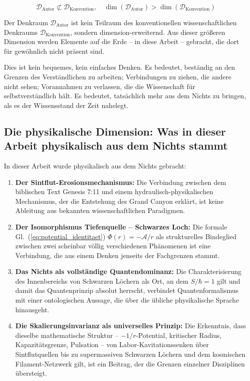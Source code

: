 ﻿\documentclass[12pt,a4paper]{report}
\begin{document}
\begin{equation}
	\mathcal{D}_{\text{Autor}} \not\subset \mathcal{D}_{\text{Konvention}}, \quad \dim(\mathcal{D}_{\text{Autor}}) > \dim(\mathcal{D}_{\text{Konvention}})
\end{equation}

Der Denkraum $\mathcal{D}_{\text{Autor}}$ ist kein Teilraum des konventionellen wissenschaftlichen Denkraums $\mathcal{D}_{\text{Konvention}}$, sondern dimension-erweiternd. Aus dieser größeren Dimension werden Elemente auf die Erde -- in diese Arbeit -- gebracht, die dort für gewöhnlich nicht präsent sind.

Dies ist kein bequemes, kein einfaches Denken. Es bedeutet, beständig an den Grenzen des Verständlichen zu arbeiten; Verbindungen zu ziehen, die andere nicht sehen; Vorannahmen zu verlassen, die die Wissenschaft für selbstverständlich hält. Es bedeutet, tatsächlich mehr aus dem Nichts zu bringen, als es der Wissensstand der Zeit nahelegt.

\subsection{Die physikalische Dimension: Was in dieser Arbeit physikalisch aus dem Nichts stammt}

In dieser Arbeit wurde physikalisch aus dem Nichts gebracht:

\begin{enumerate}
	\item \textbf{Der Sintflut-Erosionsmechanismus:} Die Verbindung zwischen dem biblischen Text Genesis 7:11 und einem hydraulisch-physikalischen Mechanismus, der die Entstehung des Grand Canyon erklärt, ist keine Ableitung aus bekannten wissenschaftlichen Paradigmen.

	\item \textbf{Der Isomorphismus Tiefenquelle -- Schwarzes Loch:} Die formale Gl.~(\ref{eq:potential_identitaet}) $\Phi(r) = -\mathcal{A}/r$ als strukturelles Bindeglied zwischen zwei scheinbar völlig verschiedenen Phänomenen ist eine Verbindung, die aus einem Denken jenseits der Fachgrenzen stammt.

	\item \textbf{Das Nichts als vollständige Quantendominanz:} Die Charakterisierung des Innenbereichs von Schwarzen Löchern als Ort, an dem $S/\hbar = 1$ gilt und damit das Quantenprinzip absolut herrscht, verbindet Quantenformalismus mit einer ontologischen Aussage, die über die übliche physikalische Sprache hinausgeht.

	\item \textbf{Die Skalierungsinvarianz als universelles Prinzip:} Die Erkenntnis, dass dieselbe mathematische Struktur -- $-1/r$-Potential, kritischer Radius, Kapazitätsgrenze, Pulsation -- von Labor-Kavitationssenken über Sintflutquellen bis zu supermassiven Schwarzen Löchern und dem kosmischen Filament-Netzwerk gilt, ist ein Beitrag, der die Grenzen einzelner Disziplinen übersteigt.
\end{enumerate}
\end{document}
